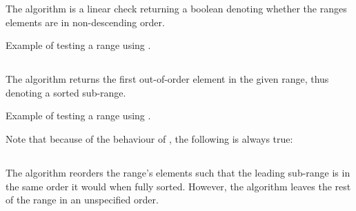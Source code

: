 The  algorithm is a linear check returning a boolean denoting whether the ranges elements are in non-descending order.


\begin{codebox}[]{\href{https://compiler-explorer.com/z/T3n9bfqdM}{\ExternalLink}}
\footnotesize Example of testing a range using .
\tcblower
{}
\end{codebox}

\subsection{\texorpdfstring{}{\texttt{std::is\_sorted\_until}}}

The  algorithm returns the first out-of-order element in the given range, thus denoting a sorted sub-range.


\begin{codebox}[]{\href{https://compiler-explorer.com/z/1dvboE6b1}{\ExternalLink}}
\footnotesize Example of testing a range using .
\tcblower
{}
\end{codebox}

Note that because of the behaviour of , the following is always true:\\
\begin{small}\end{small}

\subsection{\texorpdfstring{}{\texttt{std::partial\_sort}}}

The  algorithm reorders the range's elements such that the leading sub-range is in the same order it would when fully sorted. However, the algorithm leaves the rest of the range in an unspecified order.

